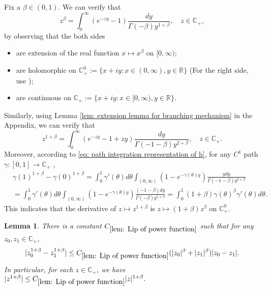 \documentclass[12pt,oneside,english]{amsart}
\theoremstyle{plain}
\newtheorem{lem}[thm]{Lemma}
\theoremstyle{definition}
\numberwithin{equation}{section}
\begin{document}
{    Fix a $\beta \in (0,1)$.
    We can verify that
\begin{equation}
    z^{\beta}
	= \int_0^\infty (e^{-zy}-1) \frac{dy}{\Gamma(-\beta)y^{1+\beta}},
    \quad z\in \mathbb C_+,
\end{equation}
	by observing that the both sides 
\begin{itemize}
\item
    are extension of the real function $x\mapsto x^{\beta}$ on $[0,\infty)$;
\item
    are holomorphic on $\mathbb C_+^0:= \{x+iy:x\in (0,\infty), y\in \mathbb R\}$ (For the right side, use \cite[Theorem 3.2. \& Theorem 3.5.]{SchillingSongVondracek2010Bernstein});
\item
    are continuous on $\mathbb C_+ :=\{x+iy: x\in [0,\infty), y\in \mathbb R\}$.
\end{itemize}
    Similarly, using Lemma \ref{lem: extension lemma for branching mechanism} in the Appendix, we can verify that
\begin{equation}
\label{eq: stable branching on C+}
    z^{1+\beta}
    = \int_0^\infty (e^{-zy}-1+zy)\frac{dy}{\Gamma(-1-\beta)y^{2+\beta}},
    \quad z\in \mathbb C_+.
\end{equation}
    Moreover, according to \eqref{eq: path integration representation of h}, for any $C^1$ path $\gamma:[0,1]\to \mathbb C_+$ ,
\begin{align}
\label{eq: integration formula for 1+beta-th power of z}
    &\gamma(1)^{1+\beta} - \gamma(0)^{1+\beta}
    = \int_0^1 \gamma'(\theta)d\theta \int_{(0,\infty)}(1-e^{-\gamma(\theta)y})\frac{ydy}{\Gamma(-1-\beta)y^{2+\beta}}
    \\&=\int_0^1 \gamma'(\theta)d\theta \int_{(0,\infty)}(1-e^{-\gamma(\theta)y})\frac{(-1-\beta)dy}{\Gamma(-\beta)y^{1+\beta}}
    = \int_0^1 (1+\beta) \gamma(\theta)^{\beta} \gamma'(\theta)d\theta.
\end{align}
    This indicates that the derivative of $z\mapsto z^{1+\beta}$ is $z\mapsto (1+\beta)z^{\beta}$ on $\mathbb C^0_+$.
\begin{lem}
\label{lem: Lip of power function}
    There is a constant $C_{\ref{lem: Lip of power function}}$ such that for any $z_0,z_1 \in \mathbb C_+$,
\begin{equation}
\label{eq: Lip of power function}
    |z_0^{1+\beta} - z_1^{1+\beta}|
    \leq C_{\ref{lem: Lip of power function}}(|z_0|^{\beta}+|z_1|^{\beta})|z_0 - z_1|.
\end{equation}
    In particular, for each $z\in \mathbb C_+$, we have
$
    |z^{1+\beta}|
    \leq  C_{\ref{lem: Lip of power function}} |z|^{1+\beta}.
$


\end{lem}}
\end{document}
